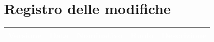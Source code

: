 \section*{Registro delle modifiche}
{

\newlength{\freewidth}
\setlength{\freewidth}{\dimexpr\textwidth-10\tabcolsep}
\renewcommand{\arraystretch}{1.5}
\centering
\setlength{\aboverulesep}{0pt}
\setlength{\belowrulesep}{0pt}
\begin{longtable}{C{.2\freewidth} C{.15\freewidth} C{.26\freewidth} C{.2\freewidth} C{.282379\freewidth}}
	\toprule
{}
\textcolor{white}{\textbf{Versione}}&
\textcolor{white}{\textbf{Data}}&
\textcolor{white}{\textbf{Nominativo}}&
\textcolor{white}{\textbf{Ruolo}}&
\textcolor{white}{\textbf{Descrizione}}\\	
\toprule
\endhead


\end{longtable}}
